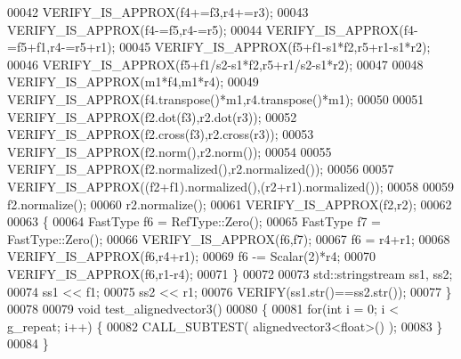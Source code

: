 \begin{DoxyCode}
00042   VERIFY\_IS\_APPROX(f4+=f3,r4+=r3);
00043   VERIFY\_IS\_APPROX(f4-=f5,r4-=r5);
00044   VERIFY\_IS\_APPROX(f4-=f5+f1,r4-=r5+r1);
00045   VERIFY\_IS\_APPROX(f5+f1-s1*f2,r5+r1-s1*r2);
00046   VERIFY\_IS\_APPROX(f5+f1/s2-s1*f2,r5+r1/s2-s1*r2);
00047   
00048   VERIFY\_IS\_APPROX(m1*f4,m1*r4);
00049   VERIFY\_IS\_APPROX(f4.transpose()*m1,r4.transpose()*m1);
00050   
00051   VERIFY\_IS\_APPROX(f2.dot(f3),r2.dot(r3));
00052   VERIFY\_IS\_APPROX(f2.cross(f3),r2.cross(r3));
00053   VERIFY\_IS\_APPROX(f2.norm(),r2.norm());
00054 
00055   VERIFY\_IS\_APPROX(f2.normalized(),r2.normalized());
00056 
00057   VERIFY\_IS\_APPROX((f2+f1).normalized(),(r2+r1).normalized());
00058   
00059   f2.normalize();
00060   r2.normalize();
00061   VERIFY\_IS\_APPROX(f2,r2);
00062   
00063   \{
00064     FastType f6 = RefType::Zero();
00065     FastType f7 = FastType::Zero();
00066     VERIFY\_IS\_APPROX(f6,f7);
00067     f6 = r4+r1;
00068     VERIFY\_IS\_APPROX(f6,r4+r1);
00069     f6 -= Scalar(2)*r4;
00070     VERIFY\_IS\_APPROX(f6,r1-r4);
00071   \}
00072   
00073   std::stringstream ss1, ss2;
00074   ss1 << f1;
00075   ss2 << r1;
00076   VERIFY(ss1.str()==ss2.str());
00077 \}
00078 
00079 \textcolor{keywordtype}{void} test\_alignedvector3()
00080 \{
00081   \textcolor{keywordflow}{for}(\textcolor{keywordtype}{int} i = 0; i < g\_repeat; i++) \{
00082     CALL\_SUBTEST( alignedvector3<float>() );
00083   \}
00084 \}
\end{DoxyCode}

